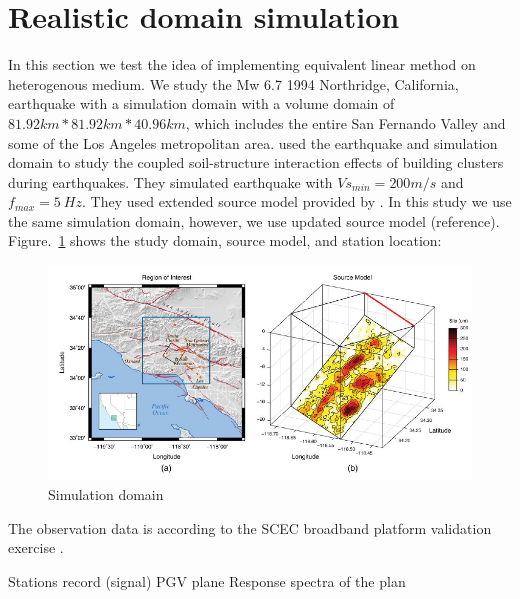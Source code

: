 \section{Realistic domain simulation}

In this section we test the idea of implementing equivalent linear method on heterogenous medium.  We study the Mw 6.7 1994 Northridge, California, earthquake with a simulation domain with a volume domain of $81.92 km*81.92 km*40.96 km$, which includes the entire San
Fernando Valley and some of the Los Angeles metropolitan area. \citet{isbiliroglu2015coupled} used the earthquake and simulation domain to study the coupled soil-structure interaction effects of building clusters during earthquakes. They simulated earthquake with $Vs_{min}=200 m/s$ and $f_{max}=5~Hz$. They used extended source model provided by \citet{graves2010broadband}. In this study we use the same simulation domain, however, we use updated source model (reference). Figure.~\ref{fig:northridge_simulation_domain_stations_temp} shows the study domain, source model, and station location:

 \begin{figure}[h]
    \centering
    \includegraphics[width=\textwidth]{figures/pdf/northridge_simulation_domain_stations_temp.pdf}
    \caption{Simulation domain}
    \label{fig:northridge_simulation_domain_stations_temp}
\end{figure}


The observation data is according to the SCEC broadband platform validation exercise \citep{goulet2014scec}.

Stations record (signal)
PGV plane
Response spectra of the plan 


